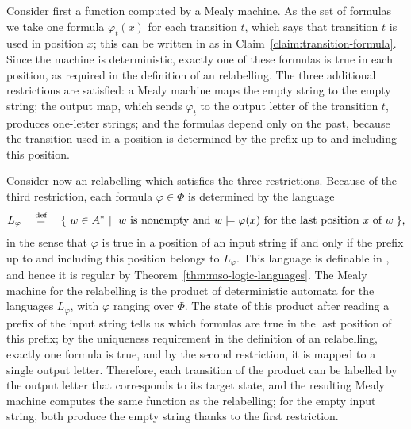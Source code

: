 \exerciseheader

 {
    Consider first a function computed by a Mealy machine. As the set of formulas we take one formula $\varphi_t(x)$ for each transition $t$, which says that transition $t$ is used in position $x$; this can be written in \mso as in Claim~\ref{claim:transition-formula}. Since the machine is deterministic, exactly one of these formulas is true in each position, as required in the definition of an \mso relabelling. The three additional restrictions are satisfied: a Mealy machine maps the empty string to the empty string; the output map, which sends $\varphi_t$ to the output letter of the transition $t$, produces one-letter strings; and the formulas depend only on the past, because the transition used in a position is determined by the prefix up to and including this position.

    Consider now an \mso relabelling which satisfies the three restrictions. Because of the third restriction, each formula $\varphi \in \Phi$ is determined by the language
    \begin{align*}
    L_\varphi \quad \eqdef \quad \setbuild{w \in A^*}{$w$ is nonempty and $w \models \varphi(x)$ for the last position $x$ of $w$},
    \end{align*}
    in the sense that $\varphi$ is true in a position of an input string if and only if the prefix up to and including this position belongs to $L_\varphi$. This language is definable in \mso, and hence it is regular by Theorem~\ref{thm:mso-logic-languages}. The Mealy machine for the relabelling is the product of deterministic automata for the languages $L_\varphi$, with $\varphi$ ranging over $\Phi$. The state of this product after reading a prefix of the input string tells us which formulas are true in the last position of this prefix; by the uniqueness requirement in the definition of an \mso relabelling, exactly one formula is true, and by the second restriction, it is mapped to a single output letter. Therefore, each transition of the product can be labelled by the output letter that corresponds to its target state, and the resulting Mealy machine computes the same function as the relabelling; for the empty input string, both produce the empty string thanks to the first restriction.
}
